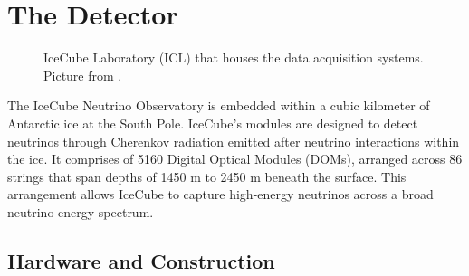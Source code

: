 \section{The Detector}
\begin{figure}
    \caption{IceCube Laboratory (ICL) that houses the data acquisition systems. Picture from \cite{IceCube_SPGallery}.}
    \label{fig:ICL}
\end{figure}

The IceCube Neutrino Observatory is embedded within a cubic kilometer of Antarctic ice at the South Pole.
IceCube's modules are designed to detect neutrinos through Cherenkov radiation emitted after neutrino interactions within the ice.
It comprises of 5160 Digital Optical Modules (DOMs), arranged across 86 strings that span depths of 1450 m to 2450 m beneath the surface.
This arrangement allows IceCube to capture high-energy neutrinos across a broad neutrino energy spectrum.

\subsection{Hardware and Construction}

